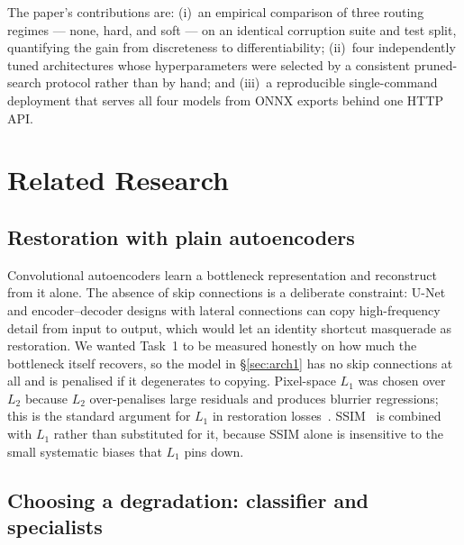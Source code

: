 \documentclass[journal]{IEEEtran}
\begin{document}
The paper's contributions are: (i)~an empirical comparison of three routing regimes --- none, hard, and soft --- on an identical corruption suite and test split, quantifying the gain from discreteness to differentiability; (ii)~four independently tuned architectures whose hyperparameters were selected by a consistent pruned-search protocol rather than by hand; and (iii)~a reproducible single-command deployment that serves all four models from ONNX exports behind one HTTP API.

\section{Related Research}
\label{sec:related}

\subsection{Restoration with plain autoencoders}

Convolutional autoencoders learn a bottleneck representation and reconstruct from it alone. The absence of skip connections is a deliberate constraint: U-Net~\cite{ronneberger2015unet} and encoder--decoder designs with lateral connections can copy high-frequency detail from input to output, which would let an identity shortcut masquerade as restoration. We wanted Task~1 to be measured honestly on how much the bottleneck itself recovers, so the model in \S\ref{sec:arch1} has no skip connections at all and is penalised if it degenerates to copying. Pixel-space $L_1$ was chosen over $L_2$ because $L_2$ over-penalises large residuals and produces blurrier regressions; this is the standard argument for $L_1$ in restoration losses~\cite{mathieu2016disentangling,isola2017pix2pix}. SSIM~\cite{wang2004image} is combined with $L_1$ rather than substituted for it, because SSIM alone is insensitive to the small systematic biases that $L_1$ pins down.

\subsection{Choosing a degradation: classifier and specialists}
\end{document}
